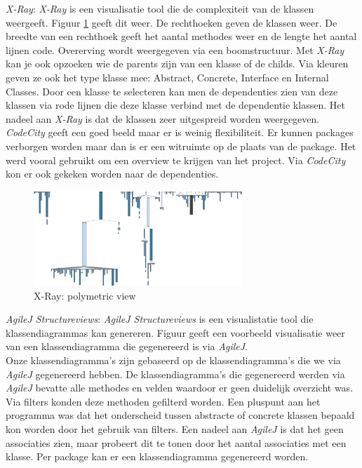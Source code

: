 \documentclass[i1]{oss}
\begin{document}
\begin{description}

\item \emph{X-Ray}: \emph{X-Ray} is een visualisatie tool die de complexiteit van de klassen weergeeft. Figuur \ref{fig:X-Ray} geeft dit weer. De rechthoeken geven de klassen weer. De breedte van een rechthoek geeft het aantal methodes weer en de lengte het aantal lijnen code. Overerving wordt weergegeven via een boomstructuur. Met \emph{X-Ray }kan je ook opzoeken wie de parents zijn van een klasse of de childs. Via kleuren geven ze ook het type klasse mee: Abstract, Concrete, Interface en Internal Classes. Door een klasse te selecteren kan men de dependenties zien van deze klassen via rode lijnen die deze klasse verbind met de dependentie klassen. Het nadeel aan \emph{X-Ray} is dat de klassen zeer uitgespreid worden weergegeven. \\
\emph{CodeCity} geeft een goed beeld maar er is weinig flexibiliteit. Er kunnen packages verborgen worden maar dan is er een witruimte op de plaats van de package. Het werd vooral gebruikt om een overview te krijgen van het project. Via \emph{CodeCity} kon er ook gekeken worden naar de dependenties. 

\begin{figure}[hb!]
	\centering
	\includegraphics[width=0.70\textwidth]{XRayComplexity}
	\caption{X-Ray: polymetric view}
	\label{fig:X-Ray}
\end{figure}

\item \emph{AgileJ Structureviews}: \emph{AgileJ Structureviews} is een visualistatie tool die klassendiagrammas kan genereren. Figuur \label{fig:AgileJklassendia} geeft een voorbeeld visualisatie weer van een klassendiagramma die gegenereerd is via \emph{AgileJ}.\\
Onze klassendiagramma's zijn gebaseerd op de klassendiagramma's die we via \emph{AgileJ} gegenereerd hebben. De klassendiagramma's die gegenereerd werden via \emph{AgileJ} bevatte alle methodes en velden waardoor er geen duidelijk overzicht was. Via filters konden deze methoden gefilterd worden. Een pluspunt aan het programma was dat het onderscheid tussen abstracte of concrete klassen bepaald kon worden door het gebruik van filters.  Een nadeel aan \emph{AgileJ} is dat het geen associaties zien, maar probeert dit te tonen door het aantal associaties met een klasse. Per package kan er een klassendiagramma gegenereerd worden. 



\end{description}
\end{document}
